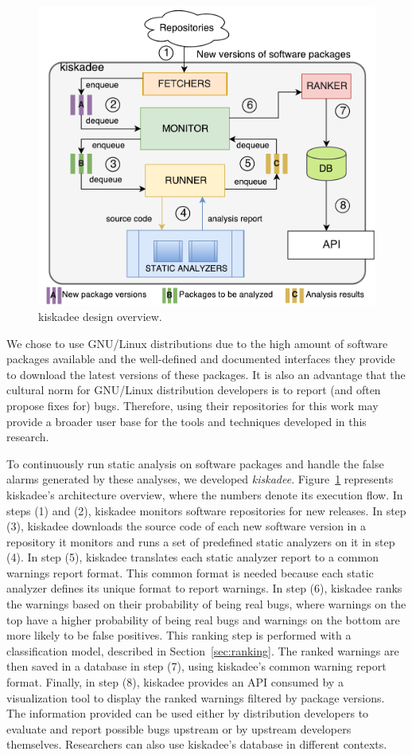 \begin{figure}[hbt]
\centering
\includegraphics[width=.7\textwidth]{figures/kiskadee-overview.pdf}
  \caption{kiskadee design overview.}\label{fig:kiskadee:overview}
\end{figure}

We chose to use GNU/Linux distributions due to the high amount of software
packages available and the well-defined and documented interfaces they provide
to download the latest versions of these packages. It is also an advantage that
the cultural norm for GNU/Linux distribution developers is to report (and often
propose fixes for) bugs. Therefore, using their repositories for this work may
provide a broader user base for the tools and techniques developed in this
research.

To continuously run static analysis on software packages and handle the false
alarms generated by these analyses, we developed \textit{kiskadee}.
Figure~\ref{fig:kiskadee:overview} represents kiskadee's architecture overview,
where the numbers denote its execution flow. In steps (1) and (2), kiskadee
monitors software repositories for new releases. In step (3), kiskadee
downloads the source code of each new software version in a repository it
monitors and runs a set of predefined static analyzers on it in step (4). In step (5),
kiskadee translates each static analyzer report to a common warnings report format.
This common format is needed because each static analyzer defines
its unique format to report warnings. In step (6), kiskadee ranks the warnings
based on their probability of being real bugs, where warnings on the top have a
higher probability of being real bugs and warnings on the bottom are more
likely to be false positives. This ranking step is performed with a
classification model, described in Section~\ref{sec:ranking}. The ranked
warnings are then saved in a database in step (7), using kiskadee's common
warning report format.  Finally, in step (8), kiskadee provides an API consumed
by a visualization tool to display the ranked warnings filtered by package
versions. The information provided can be used either by distribution developers to
evaluate and report possible bugs upstream or by upstream developers
themselves. Researchers can also use kiskadee's database in different contexts.

